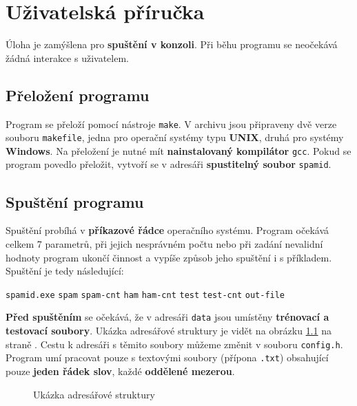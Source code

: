 \documentclass[12pt]{report}
\newcommand\la{\textlangle}  					%
\newcommand\ra{\textrangle}						%
\newcommand\laratexttt[1]{\la\texttt{#1}\ra}	%
\newcommand\indentt[1]{						
	\setlength\parindent{5mm}
	#1
	\setlength\parindent{0mm}
	}											%
\begin{document}
	\chapter{Uživatelská příručka}
	Úloha je zamýšlena pro \textbf{spuštění v konzoli}. Při běhu programu se neočekává žádná interakce s uživatelem.
	
	\section{Přeložení programu}
	Program se přeloží pomocí nástroje \texttt{make}. V archivu jsou připraveny dvě verze souboru \texttt{makefile}, jedna pro operační systémy typu \textbf{UNIX}, druhá pro systémy \textbf{Windows}. Na přeložení je nutné mít \textbf{nainstalovaný kompilátor} \texttt{gcc}. Pokud se program povedlo přeložit, vytvoří se v adresáři \textbf{spustitelný soubor} \texttt{spamid}.
		
	\section{Spuštění programu}
	Spuštění probíhá v \textbf{příkazové řádce} operačního systému. Program očekává celkem 7 parametrů, při jejich nesprávném počtu nebo při zadání nevalidní hodnoty program ukončí činnost a vypíše způsob jeho spuštění i s příkladem. Spuštění je tedy následující:
	
	\indentt{\texttt{spamid.exe} \laratexttt{spam} \laratexttt{spam-cnt} \laratexttt{ham} \laratexttt{ham-cnt} \laratexttt{test} \laratexttt{test-cnt} \laratexttt{out-file}$\,$\keys{\return}}
	
	\textbf{Před spuštěním} se očekává, že v adresáři \texttt{data} jsou umístěny \textbf{trénovací a testovací soubory}. Ukázka adresářové struktury je vidět na obrázku \ref{fig:struktura} na straně \pageref{fig:struktura}. Cestu k adresáři s těmito soubory můžeme změnit v souboru \texttt{config.h}. Program umí pracovat pouze s textovými soubory (přípona \texttt{.txt}) obsahující pouze \textbf{jeden řádek slov}, každé \textbf{oddělené mezerou}.
	
	\begin{figure}
		\centering
		\begin{minipage}{40mm}
		\end{minipage}
		\caption{Ukázka adresářové struktury}
		\label{fig:struktura}
	\end{figure}
	
\end{document}
